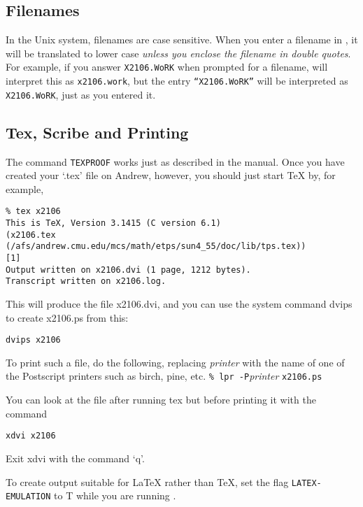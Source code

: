 \documentclass{article}
\begin{document}
\subsection{Filenames}

In the Unix system, filenames are case sensitive.  When
you enter a filename in {\ETPS}, it will be translated to lower case
{\it unless you enclose the filename in double quotes}.  For example, if
you answer {\tt X2106.WoRK} when prompted for a filename, {\ETPS} will interpret
this as {\tt x2106.work}, but the entry {\tt ``X2106.WoRK''} will be interpreted
as {\tt X2106.WoRK}, just as you entered it.



\subsection{Tex, Scribe and Printing}

The command {\tt TEXPROOF} works just as described in the {\ETPS} manual.
Once you have created your `.tex' file on Andrew, however, you should just
start TeX by, for example,
\begin{verbatim}
% tex x2106
This is TeX, Version 3.1415 (C version 6.1)
(x2106.tex (/afs/andrew.cmu.edu/mcs/math/etps/sun4_55/doc/lib/tps.tex))
[1]
Output written on x2106.dvi (1 page, 1212 bytes).
Transcript written on x2106.log.
\end{verbatim}
This will produce the file x2106.dvi, and you can use the system command
dvips to create x2106.ps from this:
\begin{verbatim}
dvips x2106
\end{verbatim}
To print such a file, do the following, replacing {\it printer} with
the name of one of the Postscript printers such as birch, pine, etc.\newline
\verb=% lpr -P={\it printer} \verb=x2106.ps=

You can look at the file after running tex but before printing it with the command
\begin{verbatim}
xdvi x2106
\end{verbatim}
Exit xdvi with the command `q'.

To create output suitable for LaTeX
rather than TeX, set the flag {\tt LATEX-EMULATION} to T while you are running {\ETPS}.
\end{document}
